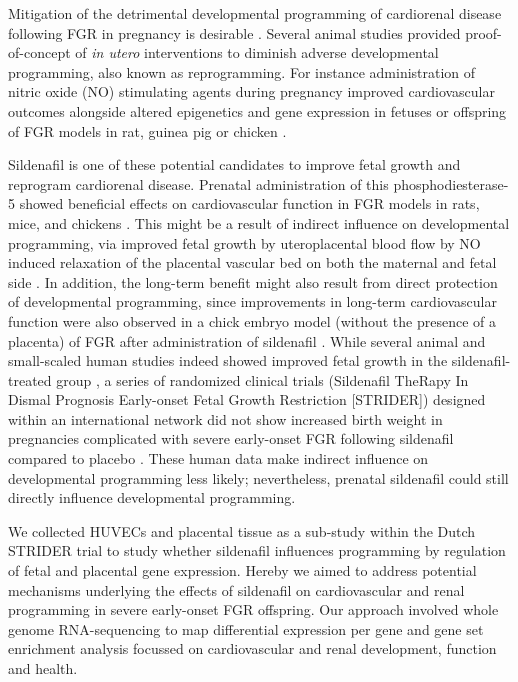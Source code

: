 \documentclass[authordate, empirical]{jote-new-article}
\begin{document}
Mitigation of the detrimental developmental programming of cardiorenal disease following FGR in pregnancy is desirable \parencites{Paauw2016}. Several animal studies provided proof-of-concept of \emph{in utero }interventions to diminish adverse developmental programming, also known as reprogramming. For instance administration of nitric oxide (NO) stimulating agents during pregnancy improved cardiovascular outcomes alongside altered epigenetics and gene expression in fetuses or offspring of FGR models in rat, guinea pig or chicken \parencites{Herrera2017}{Itani2017}{Man2020}{Wu2015}.



Sildenafil is one of these potential candidates to improve fetal growth and reprogram cardiorenal disease. Prenatal administration of this phosphodiesterase-5 showed beneficial effects on cardiovascular function in FGR models in rats, mice, and chickens \parencites{Itani2017}{Mills2018}{Terstappen2019}. This might be a result of indirect influence on developmental programming, via improved fetal growth by uteroplacental blood flow by NO induced relaxation of the placental vascular bed on both the maternal and fetal side \parencites{Krause2011}{Wareing2006}. In addition, the long-term benefit might also result from direct protection of developmental programming, since improvements in long-term cardiovascular function were also observed in a chick embryo model (without the presence of a placenta) of FGR after administration of sildenafil \parencites{Itani2017}. While several animal and small-scaled human studies indeed showed improved fetal growth in the sildenafil-treated group \parencites{Paauw2017}{VonDadelszen2011}, a series of randomized clinical trials (Sildenafil TheRapy In Dismal Prognosis Early-onset Fetal Growth Restriction [STRIDER]) designed within an international network did not show increased birth weight in pregnancies complicated with severe early-onset FGR following sildenafil compared to placebo \parencites{Pels2020}{Sharp2018}{Groom2019}. These human data make indirect influence on developmental programming less likely; nevertheless, prenatal sildenafil could still directly influence developmental programming.



We collected HUVECs and placental tissue as a sub-study within the Dutch STRIDER trial to study whether sildenafil influences programming by regulation of fetal and placental gene expression. Hereby we aimed to address potential mechanisms underlying the effects of sildenafil on cardiovascular and renal programming in severe early-onset FGR offspring. Our approach involved whole genome RNA-sequencing to map differential expression per gene and gene set enrichment analysis focussed on cardiovascular and renal development, function and health.
\end{document}
